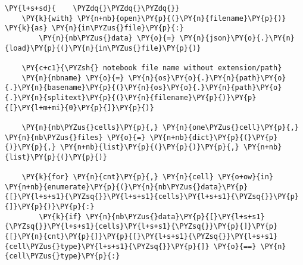 \begin{tcolorbox}[breakable, size=fbox, boxrule=1pt, pad at break*=1mm,colback=cellbackground, colframe=cellborder]
\begin{Verbatim}[commandchars=\\\{\}]
\PY{l+s+sd}{    \PYZdq{}\PYZdq{}\PYZdq{}}
    \PY{k}{with} \PY{n+nb}{open}\PY{p}{(}\PY{n}{filename}\PY{p}{)} \PY{k}{as} \PY{n}{in\PYZus{}file}\PY{p}{:}
        \PY{n}{nb\PYZus{}data} \PY{o}{=} \PY{n}{json}\PY{o}{.}\PY{n}{load}\PY{p}{(}\PY{n}{in\PYZus{}file}\PY{p}{)}

    \PY{c+c1}{\PYZsh{} notebook file name without extension/path}
    \PY{n}{nbname} \PY{o}{=} \PY{n}{os}\PY{o}{.}\PY{n}{path}\PY{o}{.}\PY{n}{basename}\PY{p}{(}\PY{n}{os}\PY{o}{.}\PY{n}{path}\PY{o}{.}\PY{n}{splitext}\PY{p}{(}\PY{n}{filename}\PY{p}{)}\PY{p}{[}\PY{l+m+mi}{0}\PY{p}{]}\PY{p}{)}

    \PY{n}{nb\PYZus{}cells}\PY{p}{,} \PY{n}{one\PYZus{}cell}\PY{p}{,} \PY{n}{nb\PYZus{}files} \PY{o}{=} \PY{n+nb}{dict}\PY{p}{(}\PY{p}{)}\PY{p}{,} \PY{n+nb}{list}\PY{p}{(}\PY{p}{)}\PY{p}{,} \PY{n+nb}{list}\PY{p}{(}\PY{p}{)}

    \PY{k}{for} \PY{n}{cnt}\PY{p}{,} \PY{n}{cell} \PY{o+ow}{in} \PY{n+nb}{enumerate}\PY{p}{(}\PY{n}{nb\PYZus{}data}\PY{p}{[}\PY{l+s+s1}{\PYZsq{}}\PY{l+s+s1}{cells}\PY{l+s+s1}{\PYZsq{}}\PY{p}{]}\PY{p}{)}\PY{p}{:}
        \PY{k}{if} \PY{n}{nb\PYZus{}data}\PY{p}{[}\PY{l+s+s1}{\PYZsq{}}\PY{l+s+s1}{cells}\PY{l+s+s1}{\PYZsq{}}\PY{p}{]}\PY{p}{[}\PY{n}{cnt}\PY{p}{]}\PY{p}{[}\PY{l+s+s1}{\PYZsq{}}\PY{l+s+s1}{cell\PYZus{}type}\PY{l+s+s1}{\PYZsq{}}\PY{p}{]} \PY{o}{==} \PY{n}{cell\PYZus{}type}\PY{p}{:}


\end{Verbatim}
\end{tcolorbox}
